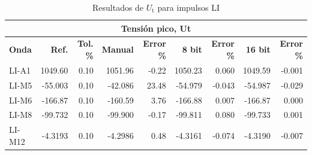 \begin{table}[H]
    \centering
    \begin{tabular}{@{}lrrrrrrrr@{}}
        \toprule
        \multicolumn{9}{c}{\textbf{Tensión pico, Ut}}                                                                                                                     \\ \midrule
        \textbf{Onda} & \textbf{Ref.} & \textbf{Tol. \%} & \textbf{Manual} & \textbf{Error \%} & \textbf{8 bit} & \textbf{Error \%} & \textbf{16 bit} & \textbf{Error \%} \\ \midrule
        LI-A1         & 1049.60       & 0.10             & 1051.96         & -0.22             & 1050.23        & 0.060             & 1049.59         & -0.001            \\ \midrule
        LI-M5         & -55.003       & 0.10             & -42.086         & 23.48             & -54.979        & -0.043            & -54.987         & -0.029            \\ \midrule
        LI-M6         & -166.87       & 0.10             & -160.59         & 3.76              & -166.88        & 0.007             & -166.87         & 0.000             \\ \midrule
        LI-M8         & -99.732       & 0.10             & -99.900         & -0.17             & -99.811        & 0.080             & -99.733         & 0.001             \\ \midrule
        LI-M12        & -4.3193       & 0.10             & -4.2986         & 0.48              & -4.3161        & -0.074            & -4.3190         & -0.007            \\ \bottomrule
    \end{tabular}
    \caption{Resultados de $U_\text{t}$ para impulsos LI}
    \label{tab:resultados_ut_li}
\end{table}

